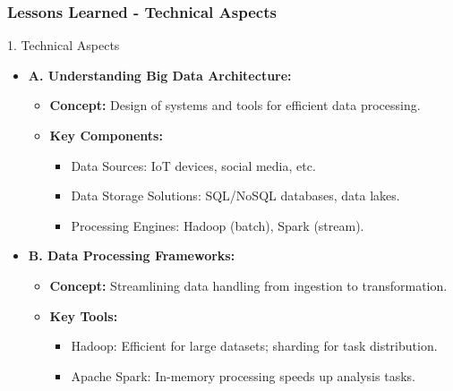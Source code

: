 \documentclass[aspectratio=169]{beamer}
\begin{document}
\begin{frame}[fragile]
    \frametitle{Lessons Learned - Technical Aspects}
    \begin{block}{1. Technical Aspects}
        \begin{itemize}
            \item \textbf{A. Understanding Big Data Architecture:}
                \begin{itemize}
                    \item \textbf{Concept:} Design of systems and tools for efficient data processing.
                    \item \textbf{Key Components:}
                    \begin{itemize}
                        \item Data Sources: IoT devices, social media, etc.
                        \item Data Storage Solutions: SQL/NoSQL databases, data lakes.
                        \item Processing Engines: Hadoop (batch), Spark (stream).
                    \end{itemize}
                \end{itemize}

            \item \textbf{B. Data Processing Frameworks:}
                \begin{itemize}
                    \item \textbf{Concept:} Streamlining data handling from ingestion to transformation.
                    \item \textbf{Key Tools:} 
                    \begin{itemize}
                        \item Hadoop: Efficient for large datasets; sharding for task distribution.
                        \item Apache Spark: In-memory processing speeds up analysis tasks.
                    \end{itemize}
                \end{itemize}
        \end{itemize}
    \end{block}
\end{frame}
\end{document}
